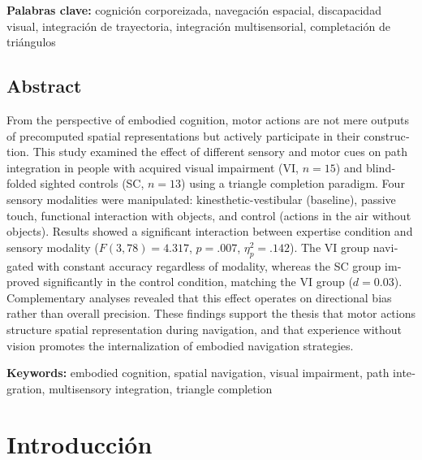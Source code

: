 \documentclass[12pt,letterpaper]{article}
\begin{document}
\textbf{Palabras clave:} cognición corporeizada, navegación espacial, discapacidad visual, integración de trayectoria, integración multisensorial, completación de triángulos

\newpage

\begin{otherlanguage}{english}
\section{Abstract}

From the perspective of embodied cognition, motor actions are not mere outputs of precomputed spatial representations but actively participate in their construction. This study examined the effect of different sensory and motor cues on path integration in people with acquired visual impairment (VI, $n = 15$) and blindfolded sighted controls (SC, $n = 13$) using a triangle completion paradigm. Four sensory modalities were manipulated: kinesthetic-vestibular (baseline), passive touch, functional interaction with objects, and control (actions in the air without objects). Results showed a significant interaction between expertise condition and sensory modality ($F(3,78) = 4.317$, $p = .007$, $\eta^2_p = .142$). The VI group navigated with constant accuracy regardless of modality, whereas the SC group improved significantly in the control condition, matching the VI group ($d = 0.03$). Complementary analyses revealed that this effect operates on directional bias rather than overall precision. These findings support the thesis that motor actions structure spatial representation during navigation, and that experience without vision promotes the internalization of embodied navigation strategies.

\textbf{Keywords:} embodied cognition, spatial navigation, visual impairment, path integration, multisensory integration, triangle completion
\end{otherlanguage}

\newpage

\section{Introducción}
\end{document}
